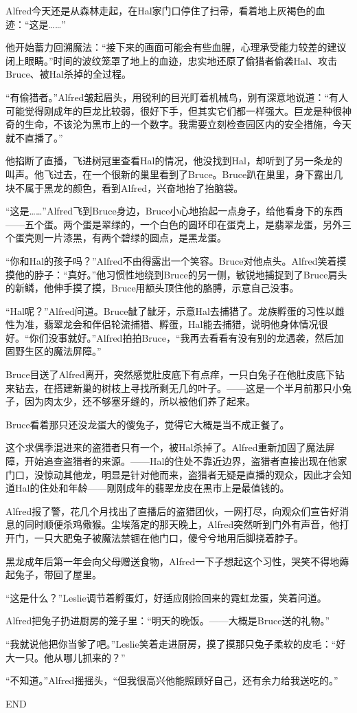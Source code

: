 \documentclass[../main.tex]{subfiles}
\begin{document}
Alfred今天还是从森林走起，在Hal家门口停住了扫帚，看着地上灰褐色的血迹：``这是\ldots\ldots''

他开始蓄力回溯魔法：``接下来的画面可能会有些血腥，心理承受能力较差的建议闭上眼睛。''时间的波纹笼罩了地上的血迹，忠实地还原了偷猎者偷袭Hal、攻击Bruce、被Hal杀掉的全过程。

``有偷猎者。''Alfred皱起眉头，用锐利的目光盯着机械鸟，别有深意地说道：``有人可能觉得刚成年的巨龙比较弱，很好下手，但其实它们都一样强大。巨龙是种很神奇的生命，不该沦为黑市上的一个数字。我需要立刻检查园区内的安全措施，今天就不直播了。''

他掐断了直播，飞进树冠里查看Hal的情况，他没找到Hal，却听到了另一条龙的叫声。他飞过去，在一个很新的巢里看到了Bruce。Bruce趴在巢里，身下露出几块不属于黑龙的颜色，看到Alfred，兴奋地抬了抬脑袋。

``这是\ldots\ldots''Alfred飞到Bruce身边，Bruce小心地抬起一点身子，给他看身下的东西------五个蛋。两个蛋是翠绿的，一个白色的圆环印在蛋壳上，是翡翠龙蛋，另外三个蛋壳则一片漆黑，有两个碧绿的圆点，是黑龙蛋。

``你和Hal的孩子吗？''Alfred不由得露出一个笑容。Bruce对他点头。Alfred笑着摸摸他的脖子：``真好。''他习惯性地绕到Bruce的另一侧，敏锐地捕捉到了Bruce肩头的新鳞，他伸手摸了摸，Bruce用额头顶住他的胳膊，示意自己没事。

``Hal呢？''Alfred问道。Bruce龇了龇牙，示意Hal去捕猎了。龙族孵蛋的习性以雌性为准，翡翠龙会和伴侣轮流捕猎、孵蛋，Hal能去捕猎，说明他身体情况很好。``你们没事就好。''Alfred拍拍Bruce，``我再去看看有没有别的龙遇袭，然后加固野生区的魔法屏障。''

Bruce目送了Alfred离开，突然感觉肚皮底下有点痒，一只白兔子在他肚皮底下钻来钻去，在搭建新巢的树枝上寻找所剩无几的叶子。------这是一个半月前那只小兔子，因为肉太少，还不够塞牙缝的，所以被他们养了起来。

Bruce看着那只还没龙蛋大的傻兔子，觉得它大概是当不成正餐了。

这个求偶季混进来的盗猎者只有一个，被Hal杀掉了。Alfred重新加固了魔法屏障，开始追查盗猎者的来源。------Hal的住处不靠近边界，盗猎者直接出现在他家门口，没惊动其他龙，明显是针对他而来，盗猎者无疑是直播的观众，因此才会知道Hal的住处和年龄------刚刚成年的翡翠龙皮在黑市上是最值钱的。

Alfred报了警，花几个月找出了直播后的盗猎团伙，一网打尽，向观众们宣告好消息的同时顺便杀鸡儆猴。尘埃落定的那天晚上，Alfred突然听到门外有声音，他打开门，一只大肥兔子被魔法禁锢在他门口，傻兮兮地用后脚挠着脖子。

黑龙成年后第一年会向父母赠送食物，Alfred一下子想起这个习性，哭笑不得地薅起兔子，带回了屋里。

``这是什么？''Leslie调节着孵蛋灯，好适应刚捡回来的霓虹龙蛋，笑着问道。

Alfred把兔子扔进厨房的笼子里：``明天的晚饭。------大概是Bruce送的礼物。''

``我就说他把你当爹了吧。''Leslie笑着走进厨房，摸了摸那只兔子柔软的皮毛：``好大一只。他从哪儿抓来的？''

``不知道。''Alfred摇摇头，``但我很高兴他能照顾好自己，还有余力给我送吃的。''

END
\end{document}
